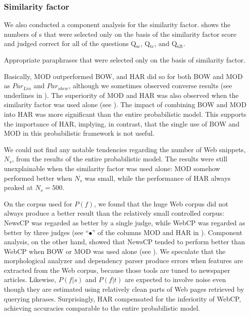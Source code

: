 \documentclass[english]{jnlp_1.4}
\begin{document}
\subsubsection{Similarity factor}
\label{sssec:eval-sim}

We also conducted a component analysis for the similarity factor.
 shows the numbers of {\pcp}s that were selected
only on the basis of the similarity factor score and judged correct
for all of the questions Q$_{\text{sc}}$, Q$_{\text{tc}}$, and
Q$_{\text{s2t}}$.

\begin{table}[t]
\caption{Appropriate paraphrases that were selected only on the basis
  of similarity factor.}
\label{tab:gen-similarity}

\end{table}


Basically, MOD outperformed BOW, and HAR did so for both BOW and MOD
as $\mathit{Par_{Lin}}$ and $\mathit{Par_{skew}}$, although we
sometimes observed converse results (see underlines in
).
The superiority of MOD and HAR was also observed when the similarity
factor was used alone (see ).  The impact of
combining BOW and MOD into HAR was more significant than the entire
probabilistic model.  This supports the importance of HAR, implying,
in contrast, that the single use of BOW and MOD in this probabilistic
framework is not useful.

We could not find any notable tendencies regarding the number of Web
snippets, $N_{s}$, from the results of the entire probabilistic model.
The results were still unexplainable when the similarity factor was
used alone: MOD somehow performed better when $N_{s}$ was small, while
the performance of HAR always peaked at $N_{s}=\text{500}$.

On the corpus used for $P(f)$, we found that the huge Web corpus did
not always produce a better result than the relatively small
controlled corpus: NewsCP was regarded as better by a single judge,
while WebCP was regarded as better by three judges (see ``$\bullet$''
of the columns MOD and HAR in ).
Component analysis, on the other hand, showed that NewsCP tended to
perform better than WebCP when BOW or MOD was used alone (see
).  We speculate that the morphological analyzer
and dependency parser produce errors when features are extracted from
the Web corpus, because those tools are tuned to newspaper articles.
Likewise, $P(f|s)$ and $P(f|t)$ are expected to involve noise even
though they are estimated using relatively clean parts of Web pages
retrieved by querying phrases.  Surprisingly, HAR compensated for the
inferiority of WebCP, achieving accuracies comparable to the entire
probabilistic model.
\end{document}
